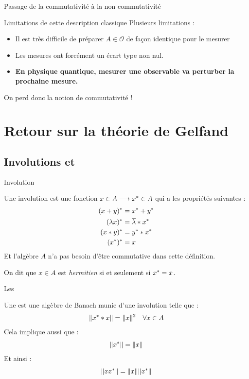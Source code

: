 \documentclass[11pt, xcolor=table]{beamer}
\begin{document}
\begin{frame}{Passage de la commutativité à la non commutativité}
    \begin{alertblock}{Limitations de cette description classique}
            Plusieurs limitations :
            \begin{itemize}[<+->]
                \item Il est très difficile de préparer $A \in \mathcal{O}$ de façon identique pour le mesurer
                \item Les mesures ont forcément un écart type non nul.
                \item \textbf{En physique quantique, mesurer une observable va perturber la prochaine mesure.}
            \end{itemize}
            On perd donc la notion de commutativité !
    \end{alertblock}
\end{frame}

\section{Retour sur la théorie de Gelfand}

\subsection{Involutions et \Calgs}

\begin{frame}{Involution}
    \begin{mydef}[Involution]
        Une involution est une fonction $x \in A \longrightarrow x^\ast \in A$ qui a les propriétés suivantes :
        \begin{align*}
            (x + y) ^\ast  &= x^\ast + y^\ast\\
            ( \lambda x) ^\ast &= \overline{\lambda} * x^\ast\\
            ( x * y) ^\ast &= y ^\ast * x^\ast\\
            (x^\ast)^\ast &= x 
        \end{align*}
        Et l'algèbre $A$ n'a pas besoin d'être commutative dans cette définition.

        On dit que $x \in A $ est \emph{hermitien} si et seulement si $x^\ast = x $.
    \end{mydef}
\end{frame}

\begin{frame}{Les \Calgs}
    \begin{mydef}
        Une \Calg est une algèbre de Banach munie d'une involution telle que : 
        \[
            \| x^\ast * x \| = \| x \|^2 \quad \forall x \in A
        \]
        Cela implique aussi que :
        \[
            \| x^\ast \| = \| x \|
        \]
        Et ainsi :
        \[
            \| x x^\ast \| = \| x \| \| x^\ast \|
        \]
    \end{mydef}
\end{frame}
\end{document}
